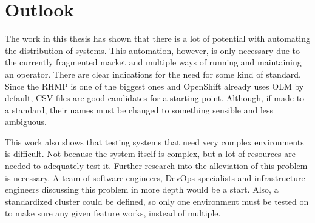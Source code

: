 \section{Outlook}\label{sec:outlook}

The work in this thesis has shown that there is a lot of potential with automating the distribution of systems.
This automation, however, is only necessary due to the currently fragmented market and multiple ways of running and maintaining an operator.
There are clear indications for the need for some kind of standard.
Since the RHMP is one of the biggest ones and OpenShift already uses OLM by default, CSV files are good candidates for a starting point.
Although, if made to a standard, their names must be changed to something sensible and less ambiguous.

This work also shows that testing systems that need very complex environments is difficult.
Not because the system itself is complex, but a lot of resources are needed to adequately test it.
Further research into the alleviation of this problem is necessary.
A team of software engineers, DevOps specialists and infrastructure engineers discussing this problem in more depth would be a start.
Also, a standardized cluster could be defined, so only one environment must be tested on to make sure any given feature works, instead of multiple.
